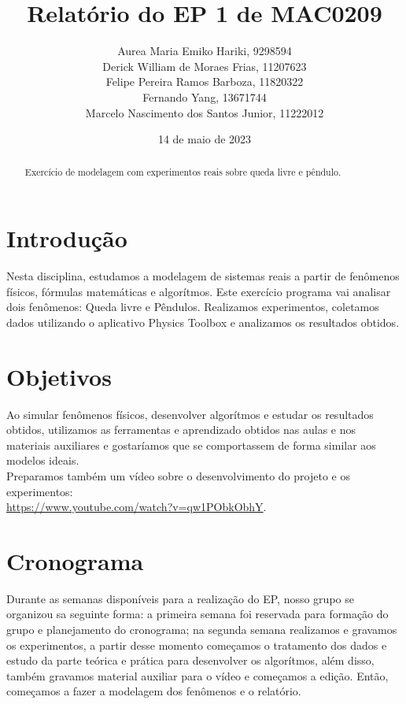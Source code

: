 \documentclass{article}
\title{Relatório do EP 1 de MAC0209}
\author{Aurea Maria Emiko Hariki, 9298594\\ Derick William de Moraes Frias, 11207623\\Felipe Pereira Ramos Barboza, 11820322\\Fernando Yang, 13671744\\Marcelo Nascimento dos Santos Junior, 11222012}
\date{14 de maio de 2023}
\begin{document}
\maketitle


\begin{abstract}
Exercício de modelagem com experimentos reais sobre queda livre e pêndulo.
\end{abstract}

\newpage

\tableofcontents

\newpage

\section{Introdução}

Nesta disciplina, estudamos a modelagem de sistemas reais a partir de fenômenos físicos, fórmulas matemáticas e algorítmos. Este exercício programa vai analisar dois fenômenos: Queda livre e Pêndulos. Realizamos experimentos, coletamos dados utilizando o aplicativo Physics Toolbox e analizamos os resultados obtidos.

\section{Objetivos}

Ao simular fenômenos físicos, desenvolver algorítmos e estudar os resultados obtidos, utilizamos as ferramentas e aprendizado obtidos nas aulas e nos materiais auxiliares e gostaríamos que se comportassem de forma similar aos modelos ideais.
\\
Preparamos também um vídeo sobre o desenvolvimento do projeto e os experimentos: \\ \href{https://www.youtube.com/watch?v=qw1PObkObhY}{https://www.youtube.com/watch?v=qw1PObkObhY}.

\section{Cronograma}

Durante as semanas disponíveis para a realização do EP, nosso grupo se organizou sa seguinte forma: a primeira semana foi reservada para formação do grupo e planejamento do cronograma; na segunda semana realizamos e gravamos os experimentos, a partir desse momento começamos o tratamento dos dados e estudo da parte teórica e prática para desenvolver os algorítmos, além disso, também gravamos material auxiliar para o vídeo e começamos a edição. Então, começamos a fazer a modelagem dos fenômenos e o relatório.
\\
\end{document}
